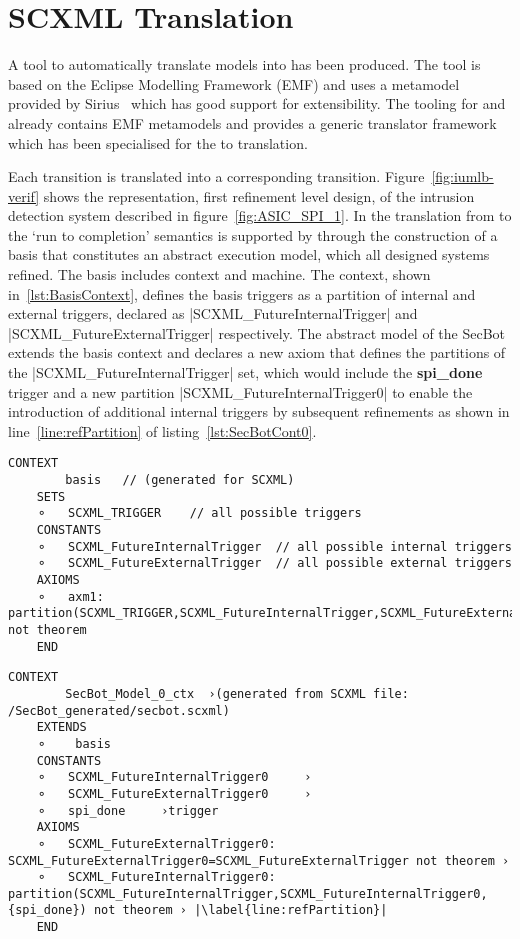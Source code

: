 \section{SCXML Translation}
\label{sec:translation}

A tool to automatically translate \SCXML models into \iUMLB has been produced. 
The tool is based on the Eclipse Modelling Framework (EMF) and uses a \SCXML metamodel provided by Sirius~\cite{siriuswebsite} which has good support for extensibility. 
The tooling for \iUMLB and \EventB already contains EMF metamodels and provides a generic translator framework which has been specialised for the \SCXML to \iUMLB translation. 

Each \SCXML transition is translated into a corresponding \iUMLB transition. Figure~\ref{fig:iumlb-verif} shows the \iUMLB representation, first refinement level design, of the intrusion detection system described in figure~\ref{fig:ASIC_SPI_1}. In the translation from \iUMLB to \EventB the `run to completion' semantics is supported by \EventB through the construction of a basis that constitutes an abstract execution model, which all designed systems refined. 
The basis includes \EventB context and machine. 
The context, shown in~\ref{lst:BasisContext}, defines the basis triggers as a partition of internal and external triggers, declared as |SCXML_FutureInternalTrigger| and |SCXML_FutureExternalTrigger| respectively. The abstract model of the SecBot extends the basis context and declares a new axiom that defines the partitions of the |SCXML_FutureInternalTrigger| set, which would include the \textbf{spi\_done} trigger and a new partition |SCXML_FutureInternalTrigger0| to enable the introduction of additional internal triggers by subsequent refinements as shown in line~\ref{line:refPartition} of listing~\ref{lst:SecBotCont0}. 

\begin{lstlisting}[caption={Abstract basis context},label={lst:BasisContext}, language=Event-B, escapechar=|, frame=single]
	CONTEXT
		basis 	// (generated for SCXML)
	SETS
	⚬	SCXML_TRIGGER	 // all possible triggers
	CONSTANTS
	⚬	SCXML_FutureInternalTrigger	 // all possible internal triggers
	⚬	SCXML_FutureExternalTrigger	 // all possible external triggers  
	AXIOMS
	⚬	axm1:	partition(SCXML_TRIGGER,SCXML_FutureInternalTrigger,SCXML_FutureExternalTrigger) not theorem 
	END
\end{lstlisting}	

\begin{lstlisting}[caption={Context for intrusion detection system abstract model},label={lst:SecBotCont0}, language=Event-B, escapechar=|, frame=single]
	CONTEXT
		SecBot_Model_0_ctx 	›(generated from SCXML file: /SecBot_generated/secbot.scxml)
	EXTENDS
	⚬	 basis 
	CONSTANTS
	⚬	SCXML_FutureInternalTrigger0	 ›
	⚬	SCXML_FutureExternalTrigger0	 ›
	⚬	spi_done	 ›trigger
	AXIOMS
	⚬	SCXML_FutureExternalTrigger0:	SCXML_FutureExternalTrigger0=SCXML_FutureExternalTrigger not theorem ›
	⚬	SCXML_FutureInternalTrigger0:	partition(SCXML_FutureInternalTrigger,SCXML_FutureInternalTrigger0,{spi_done}) not theorem › |\label{line:refPartition}|
	END
\end{lstlisting}

